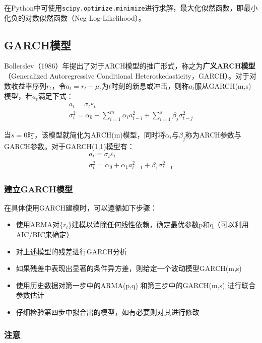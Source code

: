 \documentclass[11pt]{article}
\begin{document}
在Python中可使用\verb|scipy.optimize.minimize|进行求解，最大化似然函数，即最小化负的对数似然函数（Neg Log-Likelihood）。

\subsection{GARCH模型}

Bollerslev（1986）年提出了对于ARCH模型的推广形式，称之为\textbf{广义ARCH模型}（Generalized Autoregressive Conditional Heteroskedasticity，GARCH）。对于对数收益率序列$r_t$，令$a_t = r_t - \mu_t$为$t$时刻的新息或冲击，则称$a_t$服从GARCH(m,s)模型，若$a_t$满足下式：
\begin{gather*}
    a_t = \sigma_t \varepsilon_t \\
    \sigma_{t}^{2} = \alpha_0 + \sum_{i=1}^{m} \alpha_i a_{t-i}^2 + \sum_{i=1}^{s} \beta_j \sigma_{t-j}^{2}
\end{gather*}

当$s=0$时，该模型就简化为ARCH(m)模型，同时将$\alpha_i$与$\beta_j$称为ARCH参数与GARCH参数。对于GARCH(1,1)模型有：
\begin{gather*}
    a_t = \sigma_t \varepsilon_t \\
    \sigma_{t}^{2} = \alpha_0 + \alpha_1 a_{t-1}^2 + \beta_1 \sigma_{t-1}^{2}
\end{gather*}

\subsubsection{建立GARCH模型}

在具体使用GARCH建模时，可以遵循如下步骤：
\begin{itemize}
    \item 使用ARMA对$\{r_t\}$建模以消除任何线性依赖，确定最优参数p和q（可以利用AIC/BIC来确定）
    \item 对上述模型的残差进行GARCH分析
    \item 如果残差中表现出显著的条件异方差，则给定一个波动模型GARCH(m,s)
    \item 使用历史数据对第一步中的ARMA(p,q) 和第三步中的GARCH(m,s) 进行联合参数估计
    \item 仔细检验第四步中拟合出的模型，如有必要则对其进行修改
\end{itemize}

\subsubsection*{注意}
\end{document}

